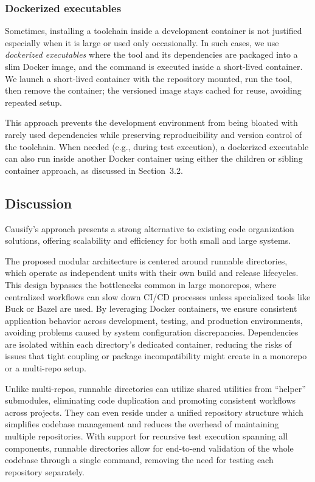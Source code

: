 \documentclass{article}
\begin{document}
\subsubsection{Dockerized executables}

Sometimes, installing a toolchain inside a development container is not
justified especially when it is large or used only occasionally. In such cases,
we use \emph{dockerized executables} where the tool and its dependencies are packaged
into a slim Docker image, and the command is executed inside a short-lived
container. We launch a short-lived container with the repository mounted, run the
tool, then remove the container; the versioned image stays cached for reuse,
avoiding repeated setup.

This approach prevents the development environment from being bloated with
rarely used dependencies while preserving reproducibility and version control of
the toolchain. When needed (e.g., during test execution), a dockerized
executable can also run inside another Docker container using either the
children or sibling container approach, as discussed in Section~3.2.

\subsection{Discussion}

Causify's approach presents a strong alternative to existing code organization solutions,
offering scalability and efficiency for both small and large systems.

The proposed modular architecture is centered around runnable directories, which
operate as independent units with their own build and release lifecycles. This
design bypasses the bottlenecks common in large monorepos, where centralized workflows
can slow down CI/CD processes unless specialized tools like Buck or Bazel are used.
By leveraging Docker containers, we ensure consistent application behavior across
development, testing, and production environments, avoiding problems caused by
system configuration discrepancies. Dependencies are isolated within each directory's
dedicated container, reducing the risks of issues that tight coupling or package
incompatibility might create in a monorepo or a multi-repo setup.

Unlike multi-repos, runnable directories can utilize shared utilities from ``helper''
submodules, eliminating code duplication and promoting consistent workflows
across projects. They can even reside under a unified repository structure which
simplifies codebase management and reduces the overhead of maintaining multiple repositories.
With support for recursive test execution spanning all components, runnable directories
allow for end-to-end validation of the whole codebase through a single command,
removing the need for testing each repository separately.
\end{document}
